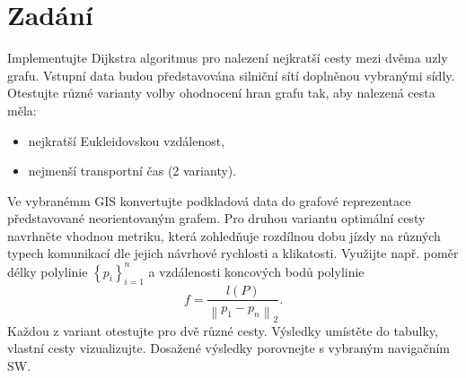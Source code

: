 \section{Zadání}

Implementujte Dijkstra algoritmus pro nalezení nejkratší cesty mezi dvěma uzly grafu. Vstupní data budou představována silniční sítí doplněnou vybranými sídly.\\
Otestujte různé varianty volby ohodnocení hran grafu tak, aby nalezená cesta měla:
\begin{itemize}
    \item nejkratší Eukleidovskou vzdálenost,
    \item nejmenší transportní čas (2 varianty).
\end{itemize}
Ve vybranémm GIS konvertujte podkladová data do grafové reprezentace představované neorientovaným grafem. Pro druhou variantu optimální cesty navrhněte vhodnou metriku, která zohledňuje rozdílnou dobu jízdy na různých typech komunikací dle jejich návrhové rychlosti a klikatosti. Využijte např. poměr délky polylinie \({\left\{p_i\right\}}_{i=1}^{n}\) a vzdálenosti koncových bodů polylinie 
\[
f = \frac{l(P)}{\left\|{p_1 - p_n}\right\|_2}.
\]
Každou z variant otestujte pro dvě různé cesty. Výsledky umístěte do tabulky, vlastní cesty vizualizujte. Dosažené výsledky porovnejte s vybraným navigačním SW.